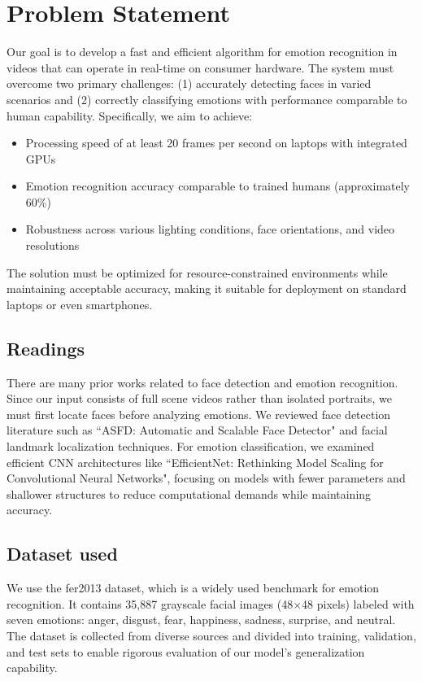 \section{Problem Statement}
Our goal is to develop a fast and efficient algorithm for emotion recognition in videos that can operate in real-time on consumer hardware. The system must overcome two primary challenges: (1) accurately detecting faces in varied scenarios and (2) correctly classifying emotions with performance comparable to human capability. Specifically, we aim to achieve:

\begin{itemize}
    \item Processing speed of at least 20 frames per second on laptops with integrated GPUs
    \item Emotion recognition accuracy comparable to trained humans (approximately 60\%)
    \item Robustness across various lighting conditions, face orientations, and video resolutions
\end{itemize}

The solution must be optimized for resource-constrained environments while maintaining acceptable accuracy, making it suitable for deployment on standard laptops or even smartphones.

\subsection{Readings}
There are many prior works related to face detection and emotion recognition. Since our input consists of full scene videos rather than isolated portraits, we must first locate faces before analyzing emotions. We reviewed face detection literature such as ``ASFD: Automatic and Scalable Face Detector"\cite{ASFD} and facial landmark localization techniques. For emotion classification, we examined efficient CNN architectures like ``EfficientNet: Rethinking Model Scaling for Convolutional Neural Networks"\cite{EfficientNet}, focusing on models with fewer parameters and shallower structures to reduce computational demands while maintaining accuracy.

\subsection{Dataset used}
We use the fer2013 dataset, which is a widely used benchmark for emotion recognition. It contains 35,887 grayscale facial images (48×48 pixels) labeled with seven emotions: anger, disgust, fear, happiness, sadness, surprise, and neutral. The dataset is collected from diverse sources and divided into training, validation, and test sets to enable rigorous evaluation of our model's generalization capability.

